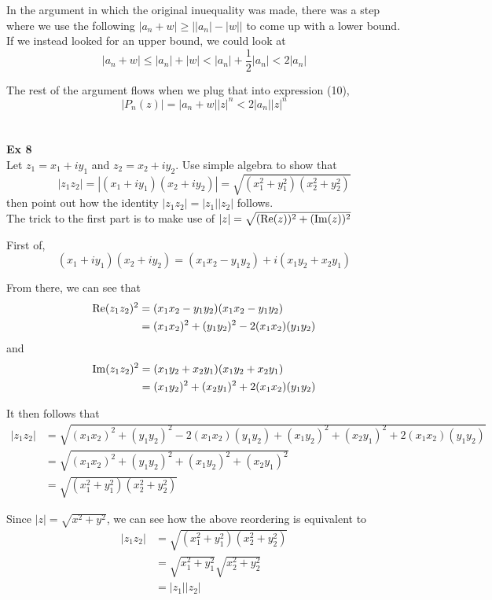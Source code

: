 In the argument in which the original inuequality was made, there was a step where we use the following
$|a_n + w| \geq \left||a_n| - |w|\right|$ to come up with a lower bound.
If we instead looked for an upper bound, we could look at
$$
|a_n + w| \leq |a_n| + |w| < |a_n| + \frac{1}{2}|a_n| < 2|a_n| 
$$

The rest of the argument flows when we plug that into expression (10),
$$
\left| P_n(z) \right| = |a_n + w| |z|^n < 2|a_n||z|^n
$$
\\~\\


\textbf{Ex 8}
\\
Let $z_1 = x_1 + iy_1$ and $z_2 = x_2 + iy_2$.
Use simple algebra to show that
$$
|z_1 z_2| = |(x_1 + iy_1) (x_2 + iy_2)| = \sqrt{ (x_{1}^{2} + y_{1}^{2}) (x_{2}^{2} + y_{2}^{2}) }
$$
then point out how the identity $|z_1 z_2| = |z_1| |z_2|$ follows.
\\

The trick to the first part is to make use of
$|z| = \sqrt{ (\operatorname{Re}(z))^2 + (\operatorname{Im}(z))^2 }$ 

First of,
$$
(x_1 + iy_1) (x_2 + iy_2) = (x_1 x_2 - y_1 y_2) + i (x_1 y_2 + x_2 y_1)
$$

From there, we can see that
\begin{align*}
\operatorname{Re}(z_1 z_2)^2 &= (x_1 x_2 - y_1 y_2) (x_1 x_2 - y_1 y_2) \\
&= (x_1 x_2)^2 + (y_1 y_2)^2 - 2(x_1 x_2)(y_1 y_2)
\end{align*}
and
\begin{align*}
\operatorname{Im}(z_1 z_2)^2 &= (x_1 y_2 + x_2 y_1) (x_1 y_2 + x_2 y_1) \\
&= (x_1 y_2)^2 + (x_2 y_1)^2 + 2(x_1 x_2)(y_1 y_2)
\end{align*}

It then follows that
\begin{align*}
|z_1 z_2| &= \sqrt{ (x_1 x_2)^2 + (y_1 y_2)^2 - 2(x_1 x_2)(y_1 y_2)   +   (x_1 y_2)^2 + (x_2 y_1)^2 + 2(x_1 x_2)(y_1 y_2) } \\
&= \sqrt{ (x_1 x_2)^2 + (y_1 y_2)^2   +  (x_1 y_2)^2 + (x_2 y_1)^2  } \\
&= \sqrt{ (x_{1}^{2} + y_{1}^{2}) (x_{2}^{2} + y_{2}^{2}) }
\end{align*}

Since $|z| = \sqrt{x^2 + y^2}$, we can see how the above reordering is equivalent to
\begin{align*}
|z_1 z_2| &= \sqrt{ (x_{1}^{2} + y_{1}^{2}) (x_{2}^{2} + y_{2}^{2}) } \\
&= \sqrt{ x_{1}^{2} + y_{1}^{2} } \sqrt{ x_{2}^{2} + y_{2}^{2} } \\
&= |z_1| |z_2|
\end{align*}
\\~\\


